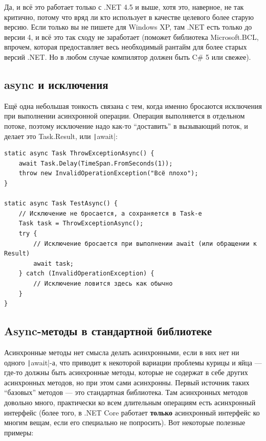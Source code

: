 \documentclass[a5paper]{article}
\begin{document}
Да, и всё это работает только с .NET 4.5 и выше, хотя это, наверное, не так критично, потому что вряд ли кто использует в качестве целевого более старую версию. Если только вы не пишете для Windows XP, там .NET есть только до версии 4, и всё это так сходу не заработает (поможет библиотека Microsoft.BCL, впрочем, которая предоставляет весь необходимый рантайм для более старых версий .NET. Но в любом случае компилятор должен быть C\# 5 или свежее).

\subsection{async и исключения}

Ещё одна небольшая тонкость связана с тем, когда именно бросаются исключения при выполнении асинхронной операции. Операция выполняется в отдельном потоке, поэтому исключение надо как-то ``доставить'' в вызывающий поток, и делает это Task.Result, или \texttt|await|:

\begin{verbatim}
static async Task ThrowExceptionAsync() {
    await Task.Delay(TimeSpan.FromSeconds(1));
    throw new InvalidOperationException("Всё плохо");
}

static async Task TestAsync() {
    // Исключение не бросается, а сохраняется в Task-е
    Task task = ThrowExceptionAsync();
    try {
        // Исключение бросается при выполнении await (или обращении к Result)
        await task;
    } catch (InvalidOperationException) {
        // Исключение ловится здесь как обычно
    }
}
\end{verbatim}

\subsection{Async-методы в стандартной библиотеке}

Асинхронные методы нет смысла делать асинхронными, если в них нет ни одного \texttt|await|-а, что приводит к некоторой вариации проблемы курицы и яйца --- где-то должны быть асинхронные методы, которые не содержат в себе других асинхронных методов, но при этом сами асинхронны. Первый источник таких ``базовых'' методов --- это стандартная библиотека. Там асинхронных методов довольно много, практически ко всем длительным операциям есть асинхронный интерфейс (более того, в .NET Core работает \textbf{только} асинхронный интерфейс ко многим вещам, если его специально не попросить). Вот некоторые полезные примеры:
\end{document}
